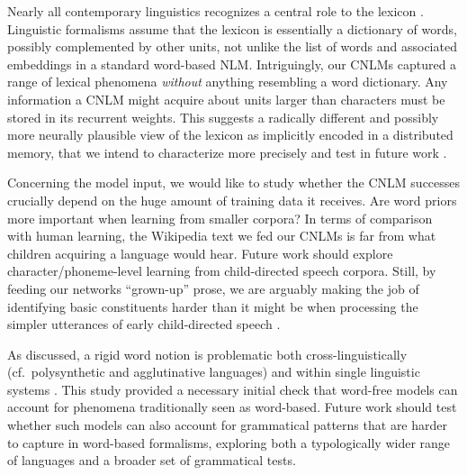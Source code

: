 Nearly all contemporary linguistics recognizes a central role to the
lexicon \cite[see, e.g.,][for very different
perspectives]{Sag:etal:2003,Goldberg:2005,Radford:2006,Bresnan:etal:2016,Jezek:2016}. Linguistic
formalisms assume that the lexicon is essentially a dictionary of
words, possibly complemented by other units, not unlike the list of
words and associated embeddings in a standard word-based
NLM. Intriguingly, our CNLMs captured a range of lexical phenomena
\emph{without} anything resembling a word dictionary. Any information
a CNLM might acquire about units larger than characters must be stored
in its recurrent weights. This suggests a radically different and
possibly more neurally plausible view of the lexicon as implicitly
encoded in a distributed memory, that we intend to characterize more
precisely and test in future work \cite[similar ideas are being
explored in a more applied NLP perspective,
e.g.,][]{gillick2016multilingual,lee2017fully,cherry2018revisiting}.

Concerning the model input, we would like to study whether the
CNLM successes crucially depend on the huge amount
of training data it receives.  Are word priors more important when
learning from smaller corpora? In terms of comparison with human
learning, the Wikipedia text we fed our CNLMs is far from
what children acquiring a language would hear. Future work should
explore character/phoneme-level learning from child-directed speech
corpora. Still, by feeding our networks ``grown-up'' prose, we are
arguably making the job of identifying basic constituents harder than
it might be when processing the simpler utterances of early
child-directed speech \cite{Tomasello:2003}.

As discussed, a rigid word notion is problematic both
cross-linguistically (cf.~polysynthetic and agglutinative languages)
and within single linguistic systems \cite[cf.~the view that
the lexicon hosts units at different levels of the linguistic
hierarchy, from morphemes to large syntactic constructions,
e.g.,][]{Jackendoff:1997,Croft:Cruse:2004,Goldberg:2005}. This study provided a necessary initial check
that word-free models can account for phenomena traditionally
seen as word-based. Future work should test whether such models
 can also account for grammatical patterns that are harder to
capture in word-based formalisms, exploring both a typologically
wider range of languages and a broader set of grammatical tests.



